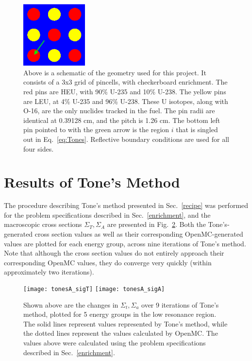 \documentclass[10pt]{article}
\begin{document}
    
 \begin{figure}
    \begin{center}
      \includegraphics[width=0.3\textwidth]{full_3x3}
      \caption{Above is a schematic of the geometry used for this project. It consists of a 3x3 grid of pincells, with checkerboard enrichment. The red pins are HEU, with 90\% U-235 and 10\% U-238. The yellow pins are LEU, at 4\% U-235 and 96\% U-238. These U isotopes, along with O-16, are the only nuclides tracked in the fuel. The pin radii are identical at 0.39128 cm, and the pitch is 1.26 cm. The bottom left pin pointed to with the green arrow is the region $i$ that is singled out in Eq.~\ref{eq:Tones}. Reflective boundary conditions are used for all four sides.}
      \label{fig:geometry}
    \end{center}
\end{figure}




  \section{Results of Tone's Method}
  The procedure describing Tone's method presented in Sec.~\ref{recipe} was performed for the problem specifications described in Sec.~\ref{enrichment}, and the macroscopic cross sections $\Sigma_T,\Sigma_A$ are presented in Fig.~\ref{fig:results1}. Both the Tone's-generated cross section values as well as their corresponding OpenMC-generated values are plotted for each energy group, across nine iterations of Tone's method. Note that although the cross section values do not entirely approach their corresponding OpenMC values, they do converge very quickly (within approximately two iterations). %
  \begin{figure}[H]
    \begin{center}
    \texttt{[image: tonesA\_sigT]}
    \texttt{[image: tonesA\_sigA]}
      \caption{Shown above are the changes in $\Sigma_t,\Sigma_a$ over 9 iterations of Tone's method, plotted for 5 energy groups in the low resonance region. The solid lines represent values represented by Tone's method, while the dotted lines represent the values calculated by OpenMC. The values above were calculated using the problem specifications described in Sec.~\ref{enrichment}.}
      \label{fig:results1}
    \end{center}
  \end{figure}
\end{document}
